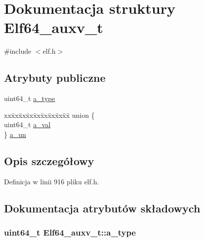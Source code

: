 \hypertarget{struct_elf64__auxv__t}{\section{Dokumentacja struktury Elf64\-\_\-auxv\-\_\-t}
\label{struct_elf64__auxv__t}
}


{\ttfamily \#include $<$elf.\-h$>$}

\subsection*{Atrybuty publiczne}
\begin{DoxyCompactItemize}
\item 
uint64\-\_\-t \hyperlink{struct_elf64__auxv__t_aa4799367aa86aa03c70a44148b14d000}{a\-\_\-type}
\item 
\begin{tabbing}
xx\=xx\=xx\=xx\=xx\=xx\=xx\=xx\=xx\=\kill
union \{\\
\>uint64\_t \hyperlink{struct_elf64__auxv__t_ae9741865b74b4fbe872d5de874feb207}{a\_val}\\
\} \hyperlink{struct_elf64__auxv__t_a988fa43fd867a7c0b571fa9f505ecc1c}{a\_un}\\

\end{tabbing}\end{DoxyCompactItemize}


\subsection{Opis szczegółowy}


Definicja w linii 916 pliku elf.\-h.



\subsection{Dokumentacja atrybutów składowych}
\hypertarget{struct_elf64__auxv__t_aa4799367aa86aa03c70a44148b14d000}{
\subsubsection[{a\-\_\-type}]{\setlength{\rightskip}{0pt plus 5cm}uint64\-\_\-t Elf64\-\_\-auxv\-\_\-t\-::a\-\_\-type}}\label{struct_elf64__auxv__t_aa4799367aa86aa03c70a44148b14d000}


